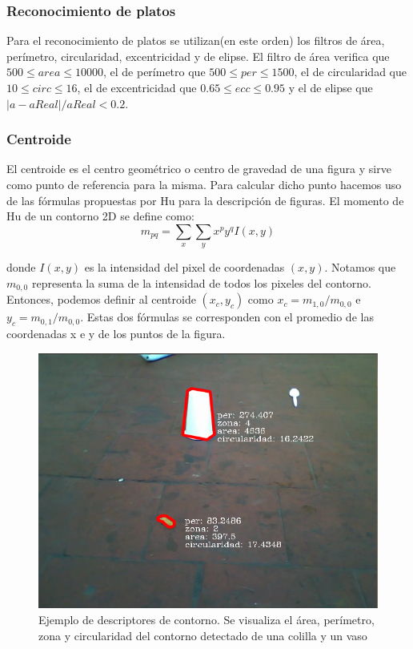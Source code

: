 	\subsubsection{Reconocimiento de platos}
	Para el reconocimiento de platos se utilizan(en este orden) los filtros de \'area, per\'imetro, circularidad, excentricidad y de elipse.
	El filtro de \'area verifica que $500 \leq area \leq 10000 $, el de per\'imetro que $500 \leq per \leq 1500 $, el de circularidad
	que $10 \leq circ \leq 16$, el de excentricidad que $0.65 \leq ecc \leq 0.95$ y el de elipse que $|a-aReal|/ aReal < 0.2$.
	
	\subsubsection{Centroide}
	El centroide es el centro geom\'etrico o centro de 
	gravedad de una figura y 
	sirve como punto de referencia para la misma. Para calcular dicho 
	punto hacemos uso de las f\'ormulas propuestas por Hu \cite{Hu1962} para la 
	descripci\'on de figuras. El momento de Hu de un contorno 2D se define como:
	\begin{equation}
		m_{pq}=\sum_{x}{\sum_{y}{x^py^qI(x,y)}}
	\end{equation}
	
	donde $I(x,y)$ es la intensidad del pixel de coordenadas $(x,y)$.
	Notamos que $m_{0,0}$ representa la suma de la intensidad de todos los pixeles del 
	contorno. Entonces, podemos definir al centroide $(x_c,y_c)$ como 
	$x_c= m_{1,0} / m_{0,0}$ e 
	$y_c=m_{0,1} / m_{0,0}$. Estas dos f\'ormulas se corresponden con el 
	promedio de las coordenadas x e y de los puntos de la figura.  


\begin{figure}[tpb]
\begin{center}
  \includegraphics[scale=0.4]{vision/figures/filtros.png}
\end{center}
  \caption[Ejemplo de descriptores de contorno]{\small Ejemplo de descriptores de contorno. Se visualiza el \'area, per\'imetro, zona y circularidad del contorno 
  detectado de una colilla y un vaso}
  \label{fig:desc}
\end{figure}

